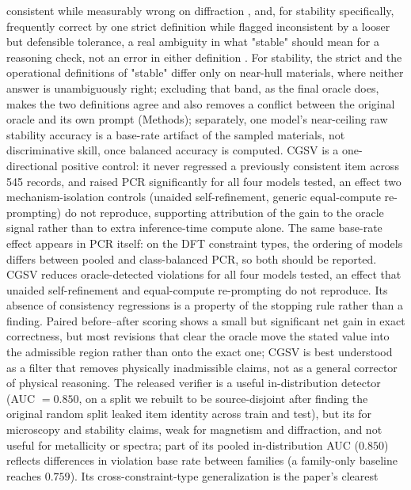\documentclass[pdflatex,sn-nature]{sn-jnl}
\newcommand{\rev}[1]{#1} %
\newcommand{\rev}[1]{{\color{blue}#1}} %
\providecommand{\DIFadd}[1]{{\protect\color{blue} \sf #1}} %
\providecommand{\DIFdel}[1]{{\protect\color{red} \scriptsize #1}} %
\providecommand{\DIFaddbegin}{} %
\providecommand{\DIFaddend}{} %
\providecommand{\DIFdelbegin}{} %
\providecommand{\DIFdelend}{} %
\providecommand{\DIFscaledelfig}{0.5}
\newlength{\DIFdelgraphicswidth} %
\newlength{\DIFdelgraphicsheight} %
\providecommand{\DIFaddincludegraphics}[2][]{{\color{blue}\fbox{\DIFOincludegraphics[#1]{#2}}}} %
\providecommand{\DIFdelincludegraphics}[2][]{%
\sbox{\DIFdelgraphicsbox}{\DIFOincludegraphics[#1]{#2}}%
\settoboxwidth{\DIFdelgraphicswidth}{\DIFdelgraphicsbox} %
\settoboxtotalheight{\DIFdelgraphicsheight}{\DIFdelgraphicsbox} %
\scalebox{\DIFscaledelfig}{%
\parbox[b]{\DIFdelgraphicswidth}{\usebox{\DIFdelgraphicsbox}\\[-\baselineskip] \rule{\DIFdelgraphicswidth}{0em}}\llap{\resizebox{\DIFdelgraphicswidth}{\DIFdelgraphicsheight}{%
\setlength{\unitlength}{\DIFdelgraphicswidth}%
\begin{picture}(1,1)%
\thicklines\linethickness{2pt} %
{\color[rgb]{1,0,0}\put(0,0){\framebox(1,1){}}}%
{\color[rgb]{1,0,0}\put(0,0){\line( 1,1){1}}}%
{\color[rgb]{1,0,0}\put(0,1){\line(1,-1){1}}}%
\end{picture}%
}\hspace*{3pt}}} %
} %
\DeclareRobustCommand{\DIFaddbegin}{\DIFOaddbegin \let\includegraphics\DIFaddincludegraphics} %
\DeclareRobustCommand{\DIFaddend}{\DIFOaddend \let\includegraphics\DIFOincludegraphics} %
\DeclareRobustCommand{\DIFdelbegin}{\DIFOdelbegin \let\includegraphics\DIFdelincludegraphics} %
\DeclareRobustCommand{\DIFdelend}{\DIFOaddend \let\includegraphics\DIFOincludegraphics} %
\begin{document}
consistent while measurably wrong on diffraction\DIFdelbegin \DIFdel{, and, for stability specifically, frequently correct
by one strict definition while flagged inconsistent by a looser but defensible
tolerance, a real ambiguity in what "stable" should mean for a reasoning check,
not an error in either definition}\DIFdelend \DIFaddbegin \DIFadd{\rev{. For stability, the strict and the operational
definitions of "stable" differ only on near-hull materials, where neither answer is unambiguously right;
excluding that band, as the final oracle does, makes the two definitions agree and also removes a conflict
between the original oracle and its own prompt (Methods)}}\DIFaddend ; separately, one model's near-ceiling raw stability
accuracy is a base-rate artifact of the sampled materials, not discriminative skill, once
balanced accuracy is computed. \DIFdelbegin \DIFdel{CGSV is a one-directional positive
control: it never regressed a previously consistent item across 545 records, and
raised PCR significantly for all four models tested, an effect two mechanism-isolation
controls (unaided self-refinement, generic equal-compute re-prompting) do not reproduce,
supporting attribution of the gain to the oracle signal rather than to extra
inference-time compute alone. }\DIFdelend \DIFaddbegin \DIFadd{\rev{The same base-rate effect appears in PCR itself: on the DFT
constraint types, the ordering of models differs between pooled and class-balanced PCR, so both
should be reported. CGSV reduces oracle-detected violations for all four models tested, an effect
that unaided self-refinement and equal-compute re-prompting do not reproduce. Its absence of
consistency regressions is a property of the stopping rule rather than a finding. Paired
before--after scoring shows a small but significant net gain in exact correctness, but most
revisions that clear the oracle move the stated value into the admissible region rather than onto
the exact one; CGSV is best understood as a filter that removes physically inadmissible claims, not
as a general corrector of physical reasoning.} }\DIFaddend The released verifier is a useful in-distribution
detector \DIFdelbegin \DIFdel{(AUC $=0.850$, on a split we rebuilt to be source-disjoint after finding the
original random split leaked item identity across train and test), but its
}\DIFdelend \DIFaddbegin \DIFadd{\rev{for microscopy and stability claims, weak for magnetism and diffraction, and not useful
for metallicity or spectra; part of its pooled in-distribution AUC ($0.850$) reflects differences in
violation base rate between families (a family-only baseline reaches $0.759$).} Its
}\DIFaddend cross-constraint-type generalization is the paper's clearest
\end{document}
